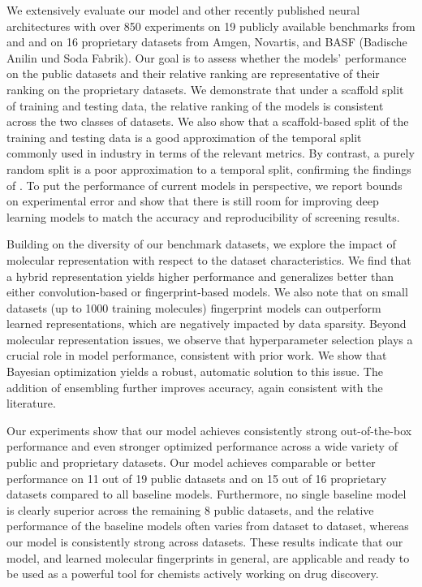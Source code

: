 \documentclass[journal=jcisd8,manuscript=article]{achemso}
\begin{document}
We extensively evaluate our model and other recently published neural architectures with over 850 experiments on 19 publicly available benchmarks from \citeauthor{Wu_2018}\cite{Wu_2018} and \citeauthor{mayr2018chembl}\cite{mayr2018chembl} and on 16 proprietary datasets from Amgen, Novartis, and BASF (Badische Anilin und Soda Fabrik). Our goal is to assess whether the models' performance on the public datasets and their relative ranking are representative of their ranking on the proprietary datasets. We demonstrate that under a scaffold split of training and testing data, the relative ranking of the models is consistent across the two classes of datasets. We also show that a scaffold-based split of the training and testing data is a good approximation of the temporal split commonly used in industry in terms of the relevant metrics. By contrast, a purely random split is a poor approximation to a temporal split, confirming the findings of \citeauthor{sheridan2015relative}\cite{sheridan2015relative}. To put the performance of current models in perspective, we report bounds on experimental error and show that there is still room for improving deep learning models to match the accuracy and reproducibility of screening results.

Building on the diversity of our benchmark datasets, we explore the impact of molecular representation with respect to the dataset characteristics. We find that a hybrid representation yields higher performance and generalizes better than either convolution-based or fingerprint-based models. We also note that on small datasets (up to 1000 training molecules) fingerprint models can outperform learned representations, which are negatively impacted by data sparsity. Beyond molecular representation issues, we observe that hyperparameter selection plays a crucial role in model performance, consistent with prior work\cite{shahriari2016bayes}. We show that Bayesian optimization yields a robust, automatic solution to this issue. The addition of ensembling further improves accuracy, again consistent with the literature\cite{dietterich2000ensemble}. 

Our experiments show that our model achieves consistently strong out-of-the-box performance and even stronger optimized performance across a wide variety of public and proprietary datasets. Our model achieves comparable or better performance on 11 out of 19 public datasets and on 15 out of 16 proprietary datasets compared to all baseline models. Furthermore, no single baseline model is clearly superior across the remaining 8 public datasets, and the relative performance of the baseline models often varies from dataset to dataset, whereas our model is consistently strong across datasets. These results indicate that our model, and learned molecular fingerprints in general, are applicable and ready to be used as a powerful tool for chemists actively working on drug discovery.
\end{document}
